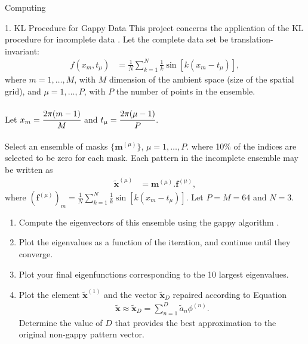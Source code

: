 \begin{section}{Computing}

\begin{homeworkSection}{1. KL Procedure for Gappy Data}
This project concerns the application of the KL procedure for incomplete data \cite{everson}. Let the complete data set be translation-invariant:
\begin{align*}
	f(x_m, t_\mu) &= \frac{1}{N} \sum_{k=1}^N \frac{1}{k} \sin[k(x_m-  t_\mu)],
\end{align*}
where $m = 1,\ldots, M$, with $M$ dimension of the ambient space (size of the spatial grid), and $\mu = 1,\ldots,P$, with $P$ the number of points in the ensemble. 
\\
\\
Let $x_m = \cfrac{2\pi(m-1)}{M}$ and $t_\mu = \cfrac{2\pi(\mu-1)}{P}$.
\\
\\
Select an ensemble of masks $\lbrace \bm{m}^{(\mu)} \rbrace$, $\mu = 1, \ldots, P$. where 10\% of the indices are selected to be zero for each mask. Each pattern in the incomplete ensemble may be written as
\begin{align*}
	\tilde{\bm{x}}^{(\mu)} &= \bm{m}^{(\mu)} . \bm{f}^{(\mu)},
\end{align*}
where $\left ( \bm{f}^{(\mu)} \right )_m = \frac{1}{N} \sum_{k=1}^N \frac{1}{k} \sin[k(x_m-  t_\mu)]$. Let $P=M=64$ and $N=3$.

\renewcommand{\theenumi}{\alph{enumi}}
\begin{enumerate}
  \item Compute the eigenvectors of this ensemble using the gappy algorithm \cite{everson}.
  \item Plot the eigenvalues as a function of the iteration, and continue until they converge.
  \item Plot your final eigenfunctions corresponding to the 10 largest eigenvalues.
  \item Plot the element $\tilde{\bm{x}}^{(1)}$ and the vector $\tilde{\bm{x}}_D$ repaired 	according to Equation
  \begin{align}
  	\tilde{\bm{x}} \approx \tilde{\bm{x}}_D = \sum_{n=1}^D \tilde{a}_n \phi^{(n)}.
  \end{align}
  Determine the value of $D$ that provides the best approximation to the original non-gappy pattern vector.
\end{enumerate}


\end{homeworkSection}
\end{section}
